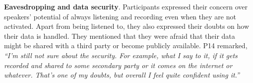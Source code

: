     \textbf{Eavesdropping and data security}.
    Participants expressed their concern over speakers’ potential of always listening and recording even when they are not activated. 
    Apart from being listened to, they also expressed their doubts on how their data is handled. They mentioned that they were afraid that their data might be shared with a third party or become publicly available. P14 remarked,
            \textit{``I'm still not sure about the security. For example, what I say to it, if it gets recorded and shared to some secondary party or it comes on the internet or whatever. That's one of my doubts, but overall I feel quite confident using it.''}
